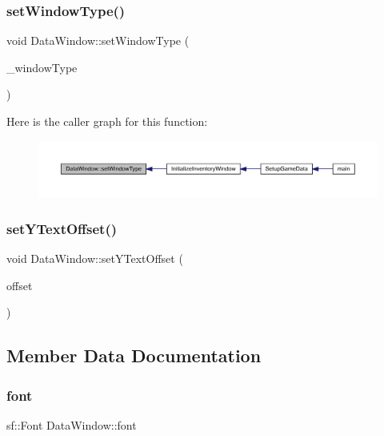 \subsubsection{\texorpdfstring{set\+Window\+Type()}{setWindowType()}}
{\footnotesize\ttfamily void Data\+Window\+::set\+Window\+Type (\begin{DoxyParamCaption}\item[{\mbox{\hyperlink{_data_window_8hpp_a3c1e0c6fe947fdbea7502497b27cf44d}{En\+Data\+Window\+Type}}}]{\+\_\+window\+Type }\end{DoxyParamCaption})}

Here is the caller graph for this function\+:
\nopagebreak
\begin{figure}[H]
\begin{center}
\leavevmode
\includegraphics[width=350pt]{d1/def/class_data_window_acd1f484d18f8f32d419d23e05e89ea31_icgraph}
\end{center}
\end{figure}
\mbox{\label{class_data_window_a48139ad5b1c02366b1f29498839da434}} 
\subsubsection{\texorpdfstring{set\+Y\+Text\+Offset()}{setYTextOffset()}}
{\footnotesize\ttfamily void Data\+Window\+::set\+Y\+Text\+Offset (\begin{DoxyParamCaption}\item[{float}]{offset }\end{DoxyParamCaption})}



\subsection{Member Data Documentation}
\mbox{\label{class_data_window_a7c7064e5c2cef5bd663dd1d6b304a59f}} 
\subsubsection{\texorpdfstring{font}{font}}
{\footnotesize\ttfamily sf\+::\+Font Data\+Window\+::font\hspace{0.3cm}{\ttfamily [private]}}


